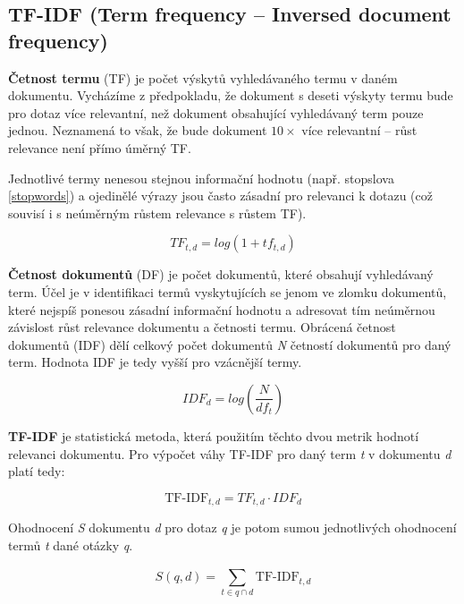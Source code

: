 \subsection{TF-IDF (Term frequency -- Inversed document frequency)}
\label{tf-idf}

\textbf{Četnost termu} (TF) je počet výskytů vyhledávaného termu v daném dokumentu. Vycházíme z předpokladu, že dokument s deseti výskyty termu bude pro dotaz více relevantní, než dokument obsahující vyhledávaný term pouze jednou. Neznamená to však, že bude dokument $10\times$ více relevantní -- růst relevance není přímo úměrný TF.\par
Jednotlivé termy nenesou stejnou informační hodnotu (např. stopslova \ref{stopwords}) a ojedinělé výrazy jsou často zásadní pro relevanci k dotazu (což souvisí i s neúměrným růstem relevance s růstem TF).\par

$$
    TF_{t,d} = log(1+tf_{t,d})
$$

\textbf{Četnost dokumentů} (DF) je počet dokumentů, které obsahují vyhledávaný term. Účel je v identifikaci termů vyskytujících se jenom ve zlomku dokumentů, které nejspíš ponesou zásadní informační hodnotu a adresovat tím neúměrnou závislost růst relevance dokumentu a četnosti termu. Obrácená četnost dokumentů (IDF) dělí celkový počet dokumentů \emph{N} četností dokumentů pro daný term. Hodnota IDF je tedy vyšší pro vzácnější termy.\par

$$
    IDF_{d} = log(\frac{N}{df_t})
$$

\textbf{TF-IDF} je statistická metoda, která použitím těchto dvou metrik hodnotí relevanci dokumentu.
Pro výpočet váhy TF-IDF pro daný term \emph{t} v dokumentu \emph{d} platí tedy:

$$
    \text{TF-IDF}_{t,d} = TF_{t,d} \cdot IDF_d
$$

Ohodnocení \emph{S} dokumentu \emph{d} pro dotaz \emph{q} je potom sumou jednotlivých ohodnocení termů \emph{t} dané otázky \emph{q}.

$$
    S(q,d) = \sum_{t\in{q \cap d}}^{}\text{TF-IDF}_{t,d}
$$

